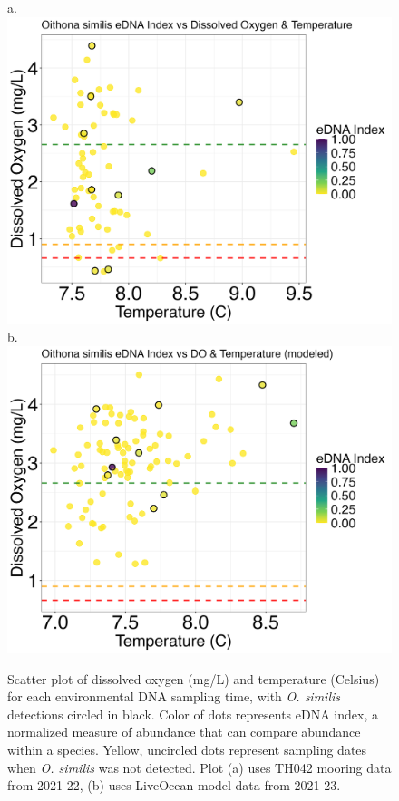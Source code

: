 \documentclass[12pt,twoside]{reedthesis}
\begin{document}
	\begin{figure}[!h]
		\begin{center}
			a. \includegraphics[scale=0.3]{Osimilis_Scatter_noOut}
			b. \includegraphics[scale=0.3]{Osimilis_Scatter_AllYr_mod_noOut}
			\caption[\textit{O. similis} scatterplot]{\footnotesize{Scatter plot of dissolved oxygen (mg/L) and temperature (Celsius) for each environmental DNA sampling time, with \textit{O. similis} detections circled in black. Color of dots represents eDNA index, a normalized measure of abundance that can compare abundance within a species. Yellow, uncircled dots represent sampling dates when \textit{O. similis} was not detected. Plot (a) uses TH042 mooring data from 2021-22, (b) uses LiveOcean model data from 2021-23.}} %
		\end{center}
		\label{OsimilisScatter}
	\end{figure} 
	
\end{document}
